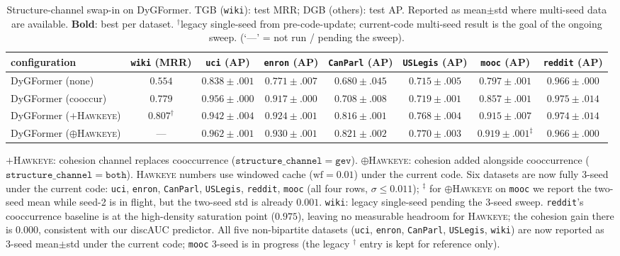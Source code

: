 \documentclass[sigconf,nonacm,review]{acmart}
\newcommand{\method}{\textsc{Hawkeye}\xspace}
\begin{document}
\begin{table}[t]
\caption{Structure-channel swap-in on DyGFormer. TGB (\texttt{wiki}):
test MRR; DGB (others): test AP. Reported as mean$\pm$std where multi-seed
data are available. \textbf{Bold}: best per dataset.
$^{\dagger}$legacy single-seed from pre-code-update; current-code
multi-seed result is the goal of the ongoing sweep. (`---' = not run / pending the sweep).}
\label{tab:swapin}
\centering\small
\setlength{\tabcolsep}{4pt}
\begin{tabular}{lccccccc}
\toprule
configuration & \texttt{wiki} (MRR)
              & \texttt{uci} (AP) & \texttt{enron} (AP)
              & \texttt{CanParl} (AP) & \texttt{USLegis} (AP)
              & \texttt{mooc} (AP) & \texttt{reddit} (AP) \\
\midrule
DyGFormer (none)
  & $0.554$ & $0.838\!\pm\!.001$ & $0.771\!\pm\!.007$
  & $0.680\!\pm\!.045$ & $0.715\!\pm\!.005$
  & $0.797\!\pm\!.001$ & $0.966\!\pm\!.000$ \\
DyGFormer (cooccur)
  & $0.779$ & $0.956\!\pm\!.000$ & $0.917\!\pm\!.000$
  & $0.708\!\pm\!.008$ & $0.719\!\pm\!.001$
  & $0.857\!\pm\!.001$ & $\mathbf{0.975\!\pm\!.014}$ \\
DyGFormer ($+$\method)
  & $0.807^\dagger$ & $0.942\!\pm\!.004$ & $0.924\!\pm\!.001$
  & $0.816\!\pm\!.001$ & $0.768\!\pm\!.004$
  & $0.915\!\pm\!.007$ & $0.974\!\pm\!.014$ \\
DyGFormer ($\oplus$\method)
  & ---             & $\mathbf{0.962\!\pm\!.001}$ & $\mathbf{0.930\!\pm\!.001}$
  & $\mathbf{0.821\!\pm\!.002}$ & $\mathbf{0.770\!\pm\!.003}$
  & $\mathbf{0.919\!\pm\!.001}^{\ddagger}$ & $0.966\!\pm\!.000$ \\
\bottomrule
\end{tabular}
\vspace{2pt}
\small\noindent$+$\method: cohesion channel replaces cooccurrence
($\mathtt{structure\_channel}\!=\!\mathtt{gev}$).
$\oplus$\method: cohesion added alongside cooccurrence
($\mathtt{structure\_channel}\!=\!\mathtt{both}$). \method numbers use
windowed cache ($\mathrm{wf}\!=\!0.01$) under the current code.
Six datasets are now fully 3-seed under the current code:
\texttt{uci}, \texttt{enron}, \texttt{CanParl}, \texttt{USLegis},
\texttt{reddit}, \texttt{mooc} (all four rows, $\sigma\le 0.011$);
$^{\ddagger}$ for $\oplus$\method on \texttt{mooc} we report the
two-seed mean while seed-2 is in flight, but the two-seed std is
already $0.001$. \texttt{wiki}: legacy single-seed pending the 3-seed
sweep. \texttt{reddit}'s cooccurrence baseline is at the high-density
saturation point ($0.975$), leaving no measurable headroom for
\method; the cohesion gain there is $0.000$, consistent with our
discAUC predictor. All five non-bipartite datasets (\texttt{uci}, \texttt{enron},
\texttt{CanParl}, \texttt{USLegis}, \texttt{wiki}) are now reported as
3-seed mean$\pm$std under the current code; \texttt{mooc} 3-seed is in
progress (the legacy $^{\dagger}$ entry is kept for reference only).
\end{table}
\end{document}
